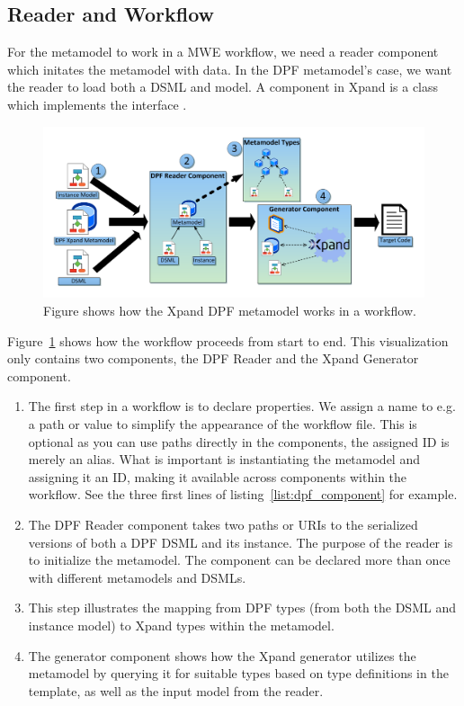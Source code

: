 \subsection{Reader and Workflow}\label{subsec:reader_workflow}
For the metamodel to work in a MWE workflow, we need a reader component which initates the metamodel with data. In the DPF metamodel's case, we want the reader to load both a DSML and model. A component in Xpand is a class which implements the interface . 

\begin{figure}[htpb]
  \centering
  \centerline{\includegraphics[scale=0.7]{images/xpand2.pdf}}
  \caption[Workflow using the DPF Xpand Metamodel]{Figure shows how the Xpand DPF metamodel works in a workflow.}
  \label{fig:xpand_dpf_workflow}
\end{figure}

Figure~\ref{fig:xpand_dpf_workflow} shows how the workflow proceeds from start to end. This visualization only contains two components, the DPF Reader and the Xpand Generator component.
\begin{enumerate}
  \item The first step in a workflow is to declare properties. We assign a name to e.g. a path or value to simplify the appearance of the workflow file. This is optional as you can use paths directly in the components, the assigned ID is merely an alias. What is important is instantiating the metamodel and assigning it an ID, making it available across components within the workflow. See the three first lines of listing~\ref{list:dpf_component} for example.
  \item The DPF Reader component takes two paths or URIs to the serialized versions of both a DPF DSML and its instance. The purpose of the reader is to initialize the metamodel. The component can be declared more than once with different metamodels and DSMLs.
  \item This step illustrates the mapping from DPF types (from both the DSML and instance model) to Xpand types within the metamodel.
  \item The generator component shows how the Xpand generator utilizes the metamodel by querying it for suitable types based on type definitions in the template, as well as the input model from the reader.
\end{enumerate}

